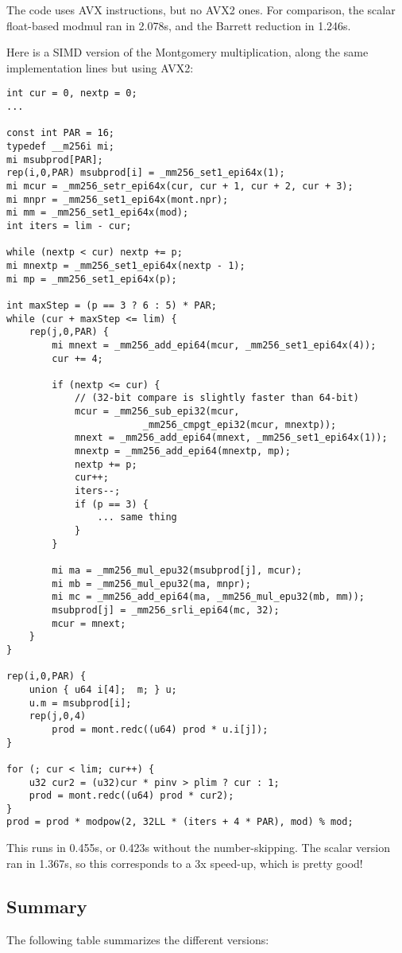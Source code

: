 The code uses AVX instructions, but no AVX2 ones.
For comparison, the scalar float-based modmul ran in 2.078s, and the Barrett reduction in 1.246s.

Here is a SIMD version of the Montgomery multiplication, along the same implementation lines but using AVX2:
\begin{lstlisting}
int cur = 0, nextp = 0;
...

const int PAR = 16;
typedef __m256i mi;
mi msubprod[PAR];
rep(i,0,PAR) msubprod[i] = _mm256_set1_epi64x(1);
mi mcur = _mm256_setr_epi64x(cur, cur + 1, cur + 2, cur + 3);
mi mnpr = _mm256_set1_epi64x(mont.npr);
mi mm = _mm256_set1_epi64x(mod);
int iters = lim - cur;

while (nextp < cur) nextp += p;
mi mnextp = _mm256_set1_epi64x(nextp - 1);
mi mp = _mm256_set1_epi64x(p);

int maxStep = (p == 3 ? 6 : 5) * PAR;
while (cur + maxStep <= lim) {
	rep(j,0,PAR) {
		mi mnext = _mm256_add_epi64(mcur, _mm256_set1_epi64x(4));
		cur += 4;

		if (nextp <= cur) {
			// (32-bit compare is slightly faster than 64-bit)
			mcur = _mm256_sub_epi32(mcur,
			            _mm256_cmpgt_epi32(mcur, mnextp));
			mnext = _mm256_add_epi64(mnext, _mm256_set1_epi64x(1));
			mnextp = _mm256_add_epi64(mnextp, mp);
			nextp += p;
			cur++;
			iters--;
			if (p == 3) {
				... same thing
			}
		}

		mi ma = _mm256_mul_epu32(msubprod[j], mcur);
		mi mb = _mm256_mul_epu32(ma, mnpr);
		mi mc = _mm256_add_epi64(ma, _mm256_mul_epu32(mb, mm));
		msubprod[j] = _mm256_srli_epi64(mc, 32);
		mcur = mnext;
	}
}

rep(i,0,PAR) {
	union { u64 i[4];  m; } u;
	u.m = msubprod[i];
	rep(j,0,4)
		prod = mont.redc((u64) prod * u.i[j]);
}

for (; cur < lim; cur++) {
	u32 cur2 = (u32)cur * pinv > plim ? cur : 1;
	prod = mont.redc((u64) prod * cur2);
}
prod = prod * modpow(2, 32LL * (iters + 4 * PAR), mod) % mod;
\end{lstlisting}

This runs in 0.455s, or 0.423s without the number-skipping.
The scalar version ran in 1.367s, so this corresponds to a 3x speed-up, which is pretty good!

\subsection{Summary}
The following table summarizes the different versions:

